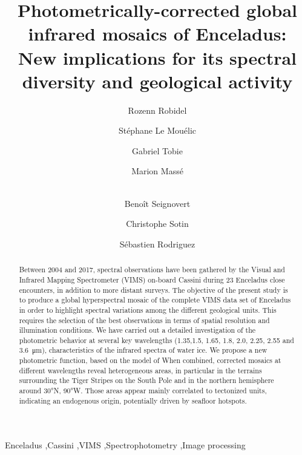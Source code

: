 \documentclass{arxiv-icarus}
\begin{document}
\begin{frontmatter}
\title{Photometrically-corrected global infrared mosaics of Enceladus:\\New implications for its spectral diversity and geological activity}

\author[LPG]{Rozenn Robidel}
\author[LPG]{St\'{e}phane Le Mou\'{e}lic}
\author[LPG]{Gabriel Tobie}
\author[LPG]{Marion Mass\'{e}}
\author[JPL]{\\Beno\^{i}t Seignovert}
\author[JPL]{Christophe Sotin}
\author[IPG]{S\'{e}bastien Rodriguez}

\address[LPG]{Laboratoire de Plan\'{e}tologie et G\'{e}odynamique, UMR 6112, CNRS, Universit\'{e} de Nantes, Nantes, France}
\address[JPL]{Jet Propulsion Laboratory, California Institute of Technology, Pasadena CA, USA}
\address[IPG]{Universit\'{w} de Paris, Institut de Physique du Globe de Paris, CNRS, Paris, France}

\begin{abstract}
Between 2004 and 2017, spectral observations have been gathered by the Visual and Infrared Mapping Spectrometer (VIMS) on-board Cassini \citep{Brown2004} during 23 Enceladus close encounters, in addition to more distant surveys. The objective of the present study is to produce a global hyperspectral mosaic of the complete VIMS data set of Enceladus in order to highlight spectral variations among the different geological units. This requires the selection of the best observations in terms of spatial resolution and illumination conditions. We have carried out a detailed investigation of the photometric behavior at several key wavelengths (\num{1.35},\num{1.5}, \num{1.65}, \num{1.8}, \num{2.0}, \num{2.25}, \num{2.55} and \SI{3.6}{\um}), characteristics of the infrared spectra of water ice. We propose a new photometric function, based on the model of \cite{Shkuratov2011} When combined, corrected mosaics at different wavelengths reveal heterogeneous areas, in particular in the terrains surrounding the Tiger Stripes on the South Pole and in the northern hemisphere around \ang{30}N, \ang{90}W. Those areas appear mainly correlated to tectonized units, indicating an endogenous origin, potentially driven by seafloor hotspots.
\end{abstract}

\begin{keyword}
Enceladus \sep Cassini \sep VIMS \sep Spectrophotometry \sep Image processing
\end{keyword}

\end{frontmatter}
\end{document}
